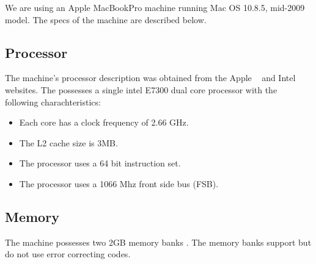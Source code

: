 We are using an Apple MacBookPro machine running Mac OS 10.8.5, mid-2009 model. The specs of the machine are described below.

\subsection{Processor}
The machine's processor description was obtained from the Apple ~\cite{appleProc} and Intel ~\cite{intelProc} websites. The possesses a single intel E7300 dual core processor with the following charachteristics: 

\begin{itemize}
\item{Each core has a clock frequency of 2.66 GHz.}
\item{The L2 cache size is 3MB.}
\item{The processor uses a 64 bit instruction set.}
\item{The 	processor uses a 1066 Mhz front side bus (FSB).}
\end{itemize}

\subsection{Memory}

The machine possesses two 2GB memory banks .
The memory banks support but do not use error correcting codes.